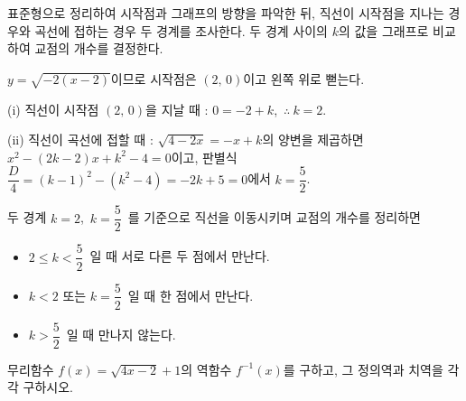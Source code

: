 \documentclass[10pt]{article}
\begin{document}
\begin{dmapproach}
표준형으로 정리하여 시작점과 그래프의 방향을 파악한 뒤, 직선이 시작점을 지나는 경우와 곡선에 접하는 경우 두 경계를 조사한다. 두 경계 사이의 $k$의 값을 그래프로 비교하여 교점의 개수를 결정한다.
\end{dmapproach}

\begin{dmsolution}
$y = \sqrt{-2(x - 2)}$이므로 시작점은 $(2,\, 0)$이고 왼쪽 위로 뻗는다.

(i) 직선이 시작점 $(2,\, 0)$을 지날 때 : $0 = -2 + k$,\ $\therefore\ k = 2$.

(ii) 직선이 곡선에 접할 때 : $\sqrt{4 - 2x} = -x + k$의 양변을 제곱하면 $x^{2} - (2k - 2)x + k^{2} - 4 = 0$이고, 판별식 $\dfrac{D}{4} = (k - 1)^{2} - (k^{2} - 4) = -2k + 5 = 0$에서 $k = \dfrac{5}{2}$.

\vspace{3mm}

두 경계 $k = 2$,\ $k = \dfrac{5}{2}$\ 를 기준으로 직선을 이동시키며 교점의 개수를 정리하면
\begin{itemize}[leftmargin=8mm, itemsep=0.5mm, topsep=1mm]
  \item $2 \le k < \dfrac{5}{2}$\ 일 때 서로 다른 두 점에서 만난다.
  \item $k < 2$ 또는 $k = \dfrac{5}{2}$\ 일 때 한 점에서 만난다.
  \item $k > \dfrac{5}{2}$\ 일 때 만나지 않는다.
\end{itemize}
\end{dmsolution}

\dmchecktitle



\newpage


\begin{dmproblem}
무리함수 $f(x) = \sqrt{4x - 2} + 1$의 역함수 $f^{-1}(x)$를 구하고, 그 정의역과 치역을 각각 구하시오.
\end{dmproblem}
\end{document}
